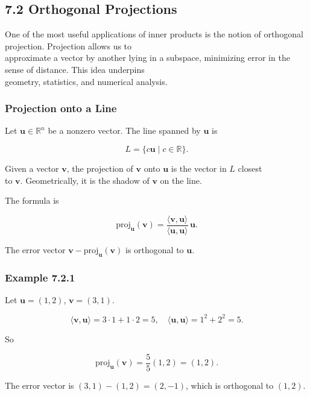 \documentclass[
  12pt,
  a4paper,
]{article}
\begin{document}
\subsection{7.2 Orthogonal Projections}\label{72-orthogonal-projections}

One of the most useful applications of inner products is the notion of
orthogonal projection. Projection allows us to\\
approximate a vector by another lying in a subspace, minimizing error in
the sense of distance. This idea underpins\\
geometry, statistics, and numerical analysis.

\subsubsection{Projection onto a Line}\label{projection-onto-a-line}

Let \(\mathbf{u} \in \mathbb{R}^n\) be a nonzero vector. The line
spanned by \(\mathbf{u}\) is

\[L = \{ c\mathbf{u} \mid c \in \mathbb{R} \}.\]

Given a vector \(\mathbf{v}\), the projection of \(\mathbf{v}\) onto
\(\mathbf{u}\) is the vector in \(L\) closest\\
to \(\mathbf{v}\). Geometrically, it is the shadow of \(\mathbf{v}\) on
the line.

The formula is

\[\text{proj}_{\mathbf{u}}(\mathbf{v}) = \frac{\langle \mathbf{v}, \mathbf{u} \rangle}{\langle \mathbf{u}, \mathbf{u} \rangle} \, \mathbf{u}.\]

The error vector \(\mathbf{v} - \text{proj}_{\mathbf{u}}(\mathbf{v})\)
is orthogonal to \(\mathbf{u}\).

\subsubsection{Example 7.2.1}\label{example-721}

Let \(\mathbf{u} = (1,2)\), \(\mathbf{v} = (3,1)\).

\[\langle \mathbf{v}, \mathbf{u} \rangle = 3\cdot 1 + 1\cdot 2 = 5, \quad
\langle \mathbf{u}, \mathbf{u} \rangle = 1^2 + 2^2 = 5.\]

So

\[\text{proj}_{\mathbf{u}}(\mathbf{v}) = \frac{5}{5}(1,2) = (1,2).\]

The error vector is \((3,1) - (1,2) = (2,-1)\), which is orthogonal to
\((1,2)\).
\end{document}
